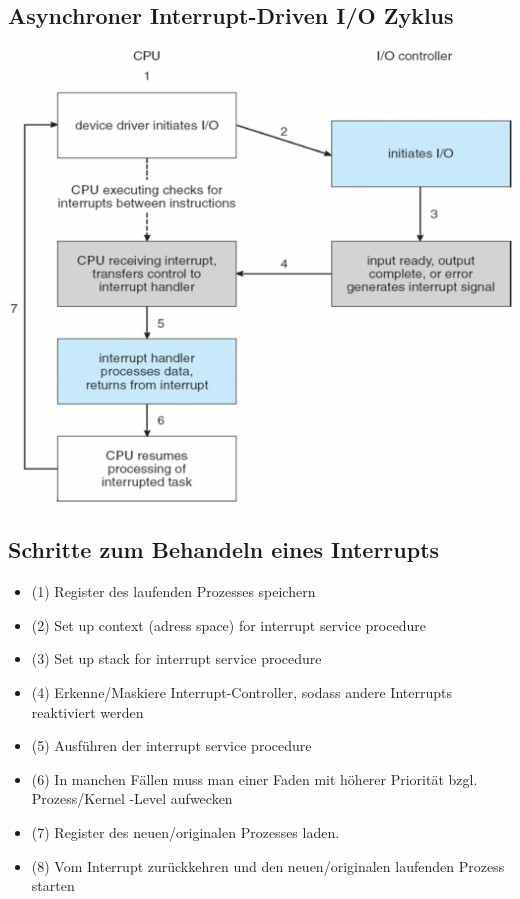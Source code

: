 \documentclass[a4paper]{scrreprt}
\begin{document}
\subsection{Asynchroner Interrupt-Driven I/O Zyklus}
\includegraphics[scale=0.3]{graphics/chapter9_6.png}
\subsection{Schritte zum Behandeln eines Interrupts}
\begin{itemize}
	\item (1) Register des laufenden Prozesses speichern
	\item (2) Set up context (adress space) for interrupt service procedure
	\item (3) Set up stack for interrupt service procedure
	\item (4) Erkenne/Maskiere Interrupt-Controller, sodass andere Interrupts reaktiviert werden
	\item (5) Ausführen der interrupt service procedure
	\item (6) In manchen Fällen muss man einer Faden mit höherer Priorität bzgl. Prozess/Kernel -Level aufwecken
	\item (7) Register des neuen/originalen Prozesses laden.
	\item (8) Vom Interrupt zurückkehren und den neuen/originalen laufenden Prozess starten
\end{itemize}
\end{document}
